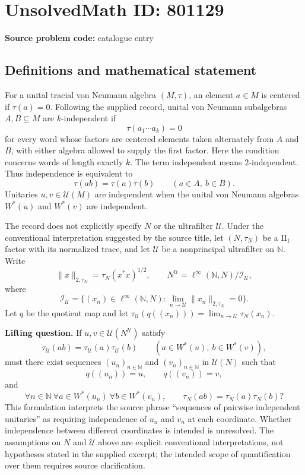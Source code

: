 \documentclass[11pt]{article}
\newcommand{\N}{\mathbb{N}}
\begin{document}
\section*{UnsolvedMath ID: 801129}
\textbf{Source problem code:} catalogue entry
\subsection{Definitions and mathematical statement}
For a unital tracial von Neumann algebra $(M,\tau)$, an element $a\in M$ is centered if $\tau(a)=0$. Following the supplied record, unital von Neumann subalgebras $A,B\subseteq M$ are $k$-independent if
\[
\tau(a_1\cdots a_k)=0
\]
for every word whose factors are centered elements taken alternately from $A$ and $B$, with either algebra allowed to supply the first factor. Here the condition concerns words of length exactly $k$. The term independent means $2$-independent. Thus independence is equivalent to
\[
\tau(ab)=\tau(a)\tau(b)\qquad(a\in A,\ b\in B).
\]
Unitaries $u,v\in\mathcal U(M)$ are independent when the unital von Neumann algebras $W^*(u)$ and $W^*(v)$ are independent.

The record does not explicitly specify $N$ or the ultrafilter $\mathcal U$. Under the conventional interpretation suggested by the source title, let $(N,\tau_N)$ be a $\mathrm{II}_1$ factor with its normalized trace, and let $\mathcal U$ be a nonprincipal ultrafilter on $\N$. Write
\[
\|x\|_{2,\tau_N}=\tau_N(x^*x)^{1/2},\qquad
N^{\mathcal U}=\ell^\infty(\N,N)\big/\mathcal I_{\mathcal U},
\]
where
\[
\mathcal I_{\mathcal U}=\{(x_n)\in\ell^\infty(\N,N):\lim_{n\to\mathcal U}\|x_n\|_{2,\tau_N}=0\}.
\]
Let $q$ be the quotient map and let $\tau_{\mathcal U}(q((x_n)))=\lim_{n\to\mathcal U}\tau_N(x_n)$.

\textbf{Lifting question.} If $u,v\in\mathcal U(N^{\mathcal U})$ satisfy
\[
\tau_{\mathcal U}(ab)=\tau_{\mathcal U}(a)\tau_{\mathcal U}(b)
\qquad(a\in W^*(u),\ b\in W^*(v)),
\]
must there exist sequences $(u_n)_{n\in\N}$ and $(v_n)_{n\in\N}$ in $\mathcal U(N)$ such that
\[
q((u_n))=u,\qquad q((v_n))=v,
\]
and
\[
\forall n\in\N\ \forall a\in W^*(u_n)\ \forall b\in W^*(v_n),\qquad
\tau_N(ab)=\tau_N(a)\tau_N(b)?
\]
This formulation interprets the source phrase ``sequences of pairwise independent unitaries'' as requiring independence of $u_n$ and $v_n$ at each coordinate. Whether independence between different coordinates is intended is unresolved. The assumptions on $N$ and $\mathcal U$ above are explicit conventional interpretations, not hypotheses stated in the supplied excerpt; the intended scope of quantification over them requires source clarification.
\end{document}
